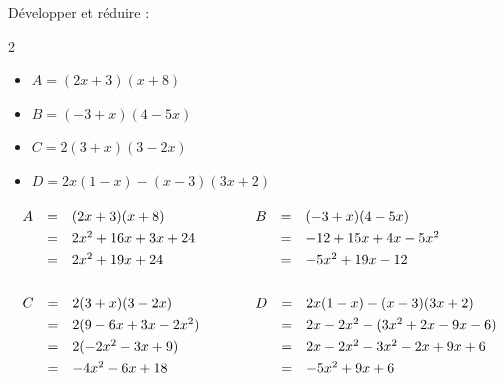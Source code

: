 \begin{methode}
	Développer et réduire :
	\begin{multicols}{2}
		\begin{itemize}
			\item $A = (2x + 3)(x + 8)$
			\item $B = (-3 + x)(4 - 5x)$
			\item $C = 2(3 + x)(3 - 2x)$
			\item $D = 2x(1 - x) - (x - 3)(3x + 2)$
		\end{itemize}
	\end{multicols}

	\begin{correction}
		\[
			\begin{array}{ll}%
				\def\arraystretch{1.3}%
				\begin{array}{rcl}%
					A & = & (2x + 3)(x + 8)      \\
					  & = & 2x^2 + 16x + 3x + 24 \\
					  & = & 2x^2 + 19x + 24      \\
				\end{array}  \quad & \quad %
				\def\arraystretch{1.3}%
				\begin{array}{rcl}%
					B & = & (-3 + x)(4 - 5x)      \\
					  & = & -12 + 15x + 4x - 5x^2 \\
					  & = & -5x^2 + 19x - 12      \\
				\end{array} \\ & \\%
				\def\arraystretch{1.3}%
				\begin{array}{rcl}%
					C & = & 2(3 + x)(3 - 2x)      \\
					  & = & 2(9 - 6x + 3x - 2x^2) \\
					  & = & 2(-2x^2 - 3x + 9)     \\
					  & = & -4x^2 - 6x + 18       \\
				\end{array}  \quad & \quad %
				\def\arraystretch{1.3}%
				\begin{array}{rcl}%
					D & = & 2x(1 - x) - (x - 3)(3x + 2)      \\
					  & = & 2x - 2x^2 - (3x^2 + 2x - 9x - 6) \\
					  & = & 2x - 2x^2 - 3x^2 - 2x + 9x + 6   \\
					  & = & -5x^2 + 9x + 6                   \\
				\end{array}%
			\end{array}%
		\]
	\end{correction}
\end{methode}
\newpage

